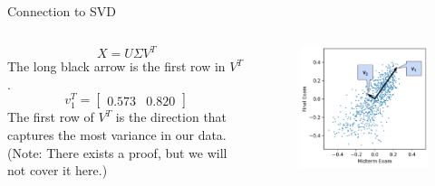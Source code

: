 \documentclass[aspectratio=169]{../latex_main/tntbeamer}  %
\begin{document}
	
	\begin{frame}{Connection to SVD}
	    \begin{columns}
	        \begin{column}{.5\textwidth}
	               \begin{equation*}
	                   X = U\Sigma V^T
	               \end{equation*}
	               The long black arrow is the first row in $V^T$.
                  \begin{equation*}
                      v_1^T = [\begin{array}{cc}
                          0.573 & 0.820
                      \end{array}]
                  \end{equation*}
                  The first row of $V^T$ is the direction that captures the most variance in our data.
                  (Note: There exists a proof, but we will not cover it here.)

	        \end{column}
	        
	        
	        \begin{column}{.5\textwidth}
	                \begin{figure}
	                    \centering
	                    \includegraphics[scale=.35]{Bild8}
	                \end{figure}
	        \end{column}
	    \end{columns}
	\end{frame}
	
\end{document}
